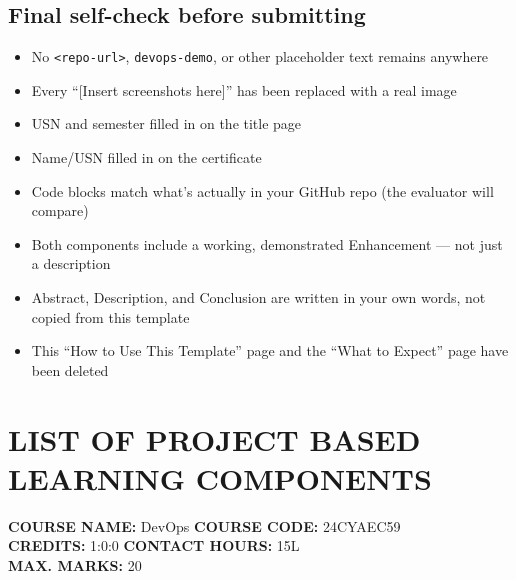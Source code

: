 \documentclass[12pt,a4paper]{article}
\newcommand{\sizeTwelve}{\fontsize{12pt}{14.5pt}\selectfont}  %
\begin{document}
\subsection*{Final self-check before submitting}
\begin{itemize}[nosep]
    \item[$\square$] No \texttt{<repo-url>}, \texttt{devops-demo}, or other placeholder text remains anywhere
    \item[$\square$] Every ``[Insert screenshots here]'' has been replaced with a real image
    \item[$\square$] USN and semester filled in on the title page
    \item[$\square$] Name/USN filled in on the certificate
    \item[$\square$] Code blocks match what's actually in your GitHub repo (the evaluator will compare)
    \item[$\square$] Both components include a working, demonstrated Enhancement --- not just a description
    \item[$\square$] Abstract, Description, and Conclusion are written in your own words, not copied from this template
    \item[$\square$] This ``How to Use This Template'' page and the ``What to Expect'' page have been deleted
\end{itemize}

\newpage

\section*{LIST OF PROJECT BASED LEARNING COMPONENTS}

\noindent
{\sizeTwelve
\textbf{COURSE NAME:} DevOps \hfill \textbf{COURSE CODE:} 24CYAEC59 \\
\textbf{CREDITS:} 1:0:0 \hfill \textbf{CONTACT HOURS:} 15L \\
\textbf{MAX. MARKS:} 20
\par}

\vspace{0.6cm}
\end{document}
